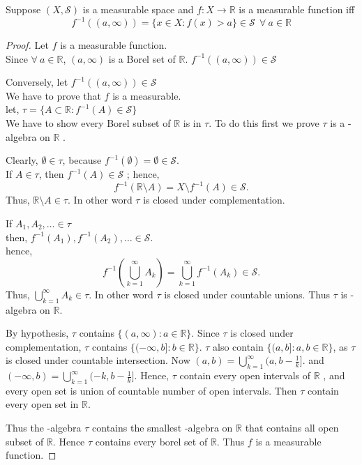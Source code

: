 \begin{theorem}
    Suppose $(X,\mathcal{S})$ is a measurable space and $f:X\to\mathds{R}$ is a measurable function iff 
    \[
        f^{-1}((a,\infty))=\{x\in X: f(x)>a\}\in\mathcal{S}\ \ \forall \ a\in\mathds{R}
    \]
\end{theorem}
\begin{proof}
    Let $f$ is a measurable function.\\
    Since $\forall \ a \in\mathds{R}$, $(a,\infty)$ is a Borel set of  $\mathds{R}$. $f^{-1}((a,\infty))\in \mathcal{S}$
    
    Conversely, let $f^{-1}((a,\infty))\in \mathcal{S}$\\
    We have to prove that $f$ is a measurable.\\
    let,  $\tau=\{A\subset\mathds{R}:f^{-1}(A)\in\mathcal{S}\}$\\
    We have to show every Borel subset of $\mathds{R}$ is in $\tau$. To do this first we prove $\tau$ is a  \sig-algebra on $\mathds{R}$ .

    Clearly, $\emptyset\in\tau$, because  $f^{-1}(\emptyset)=\emptyset\in \mathcal{S}$.\\
    If $A\in\tau$, then  $f^{-1}(A)\in\mathcal{S}$ ; hence,
    \[
        f^{-1}(\mathds{R}\setminus A)=X\setminus f^{-1}(A)\in \mathcal{S}.
    \]
    Thus, $\mathds{R}\setminus A\in \tau$. In other word $\tau$ is closed  under complementation.

    If $A_1,A_2,\ldots\in \tau$\\
    then, $f^{-1}(A_1),f^{-1}(A_2),\ldots\in\mathcal{S}$.\\
    hence, 
    \[
        f^{-1}(\bigcup_{k=1}^{\infty}A_k)=\bigcup_{k=1}^{\infty}f^{-1}(A_k)\in \mathcal{S}.
    \]
    Thus, $\bigcup_{k=1}^{\infty}A_k\in\tau$. In other word $\tau$ is closed under countable unions. Thus  $\tau$ is \sig-algebra on  $\mathds{R}$.
    
    By hypothesis, $\tau$ contains  $\{(a,\infty):a\in\mathds{R}\}$. Since $\tau$ is closed under complementation,  $\tau$ contains  $\{(-\infty,b]:b\in\mathds{R}\}$.
    $\tau$ also contain  $\{(a,b]:a,b\in\mathds{R}\}$, as $\tau$ is closed under countable intersection. Now  $(a,b)=\bigcup_{k=1}^{\infty}(a,b-\frac{1}{k}]$.
    and $(-\infty,b)=\bigcup_{k=1}^{\infty}(-k,b-\frac{1}{k}]$. Hence, $\tau$ contain every open intervals of  $\mathds{R}$ , and every open set is union of 
    countable number of open intervals. Then $\tau$ contain every open set in $\mathds{R}$.

    Thus the \sig-algebra $\tau$ contains the smallest  \sig-algebra on  $\mathds{R}$ that contains all open subset of $\mathds{R}$. Hence $\tau$ contains every borel set of  $\mathds{R}$. Thus $f$ is a measurable function.
\end{proof}

